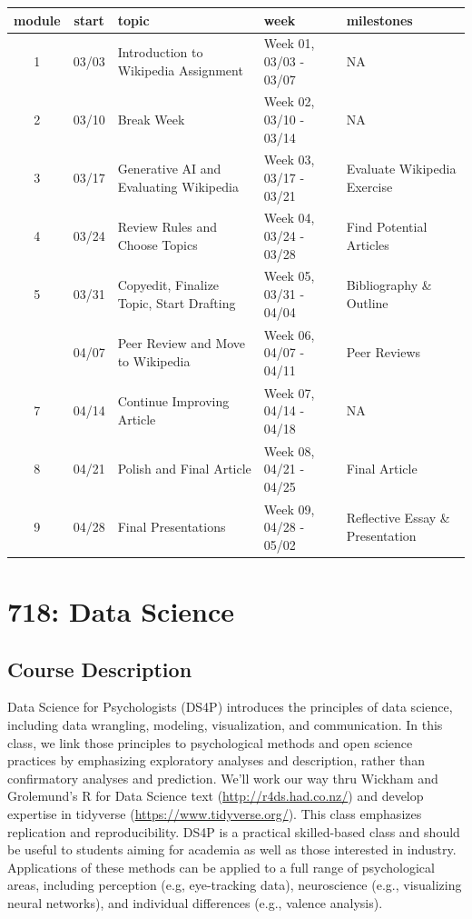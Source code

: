 \documentclass[
]{book}
\begin{document}
\begin{longtable}{ccp{3in}ll}
\toprule
module & start & topic & week & milestones\\
\midrule
1 & 03/03 & Introduction to Wikipedia Assignment & Week 01, 03/03 - 03/07 & NA\\
2 & 03/10 & Break Week & Week 02, 03/10 - 03/14 & NA\\
3 & 03/17 & Generative AI and Evaluating Wikipedia & Week 03, 03/17 - 03/21 & Evaluate Wikipedia Exercise\\
4 & 03/24 & Review Rules and Choose Topics & Week 04, 03/24 - 03/28 & Find Potential Articles\\
5 & 03/31 & Copyedit, Finalize Topic, Start Drafting & Week 05, 03/31 - 04/04 & Bibliography \& Outline\\
\addlinespace
6 & 04/07 & Peer Review and Move to Wikipedia & Week 06, 04/07 - 04/11 & Peer Reviews\\
7 & 04/14 & Continue Improving Article & Week 07, 04/14 - 04/18 & NA\\
8 & 04/21 & Polish and Final Article & Week 08, 04/21 - 04/25 & Final Article\\
9 & 04/28 & Final Presentations & Week 09, 04/28 - 05/02 & Reflective Essay \& Presentation\\
\bottomrule
\end{longtable}

\chapter*{718: Data Science}\label{data-science}


\section*{Course Description}\label{course-description-5}


Data Science for Psychologists (DS4P) introduces the principles of data science, including data wrangling, modeling, visualization, and communication. In this class, we link those principles to psychological methods and open science practices by emphasizing exploratory analyses and description, rather than confirmatory analyses and prediction. We'll work our way thru Wickham and Grolemund's R for Data Science text (\url{http://r4ds.had.co.nz/}) and develop expertise in tidyverse (\url{https://www.tidyverse.org/}). This class emphasizes replication and reproducibility. DS4P is a practical skilled-based class and should be useful to students aiming for academia as well as those interested in industry. Applications of these methods can be applied to a full range of psychological areas, including perception (e.g, eye-tracking data), neuroscience (e.g., visualizing neural networks), and individual differences (e.g., valence analysis).
\end{document}
